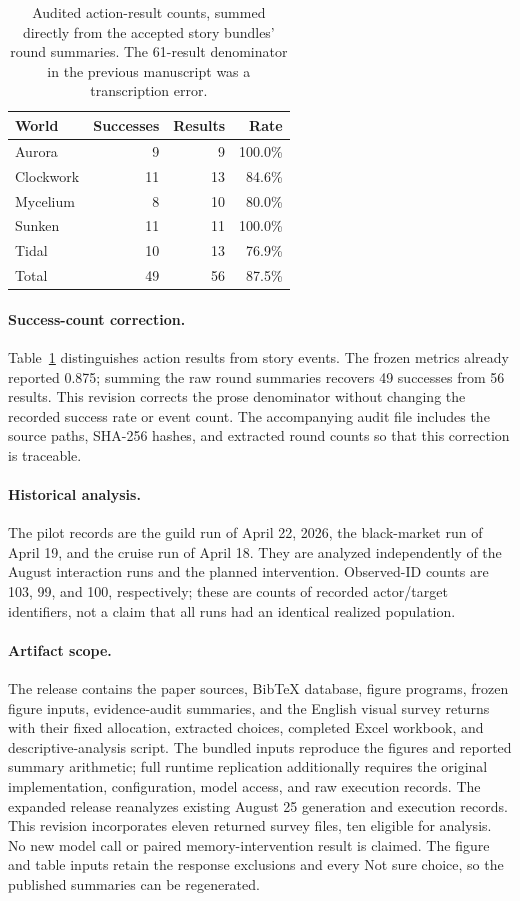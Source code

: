 \begin{table}[t]
\centering\small
\begin{tabular}{@{}lrrr@{}}
\toprule
World & Successes & Results & Rate \\
\midrule
Aurora & 9 & 9 & 100.0\% \\
Clockwork & 11 & 13 & 84.6\% \\
Mycelium & 8 & 10 & 80.0\% \\
Sunken & 11 & 11 & 100.0\% \\
Tidal & 10 & 13 & 76.9\% \\
\midrule
Total & 49 & 56 & 87.5\% \\
\bottomrule
\end{tabular}
\caption{Audited action-result counts, summed directly from the accepted
story bundles' round summaries. The 61-result denominator in the previous
manuscript was a transcription error.}
\label{tab:result-audit}
\end{table}

\paragraph{Success-count correction.}
Table~\ref{tab:result-audit} distinguishes action results from story events.
The frozen metrics already reported 0.875; summing the raw round summaries
recovers 49 successes from 56 results. This revision corrects the prose
denominator without changing the recorded success rate or event count.
The accompanying audit file includes the source paths, SHA-256 hashes, and
extracted round counts so that this correction is traceable.

\paragraph{Historical analysis.}
The pilot records are the guild run of April 22, 2026, the black-market run of
April 19, and the cruise run of April 18. They are analyzed independently of
the August interaction runs and the planned intervention. Observed-ID counts
are 103, 99, and 100, respectively; these are counts of recorded actor/target
identifiers, not a claim that all runs had an identical realized population.

\paragraph{Artifact scope.}
The release contains the paper sources, BibTeX database, figure programs,
frozen figure inputs, evidence-audit summaries, and the English visual survey
returns with their fixed allocation, extracted choices, completed Excel
workbook, and descriptive-analysis script. The bundled inputs reproduce the figures and reported
summary arithmetic; full runtime replication additionally requires the
original implementation, configuration, model access, and raw execution
records. The expanded release reanalyzes existing August 25 generation and execution
records. This revision incorporates eleven returned survey files, ten eligible
for analysis. No new model call or paired memory-intervention result is
claimed. The figure and table inputs retain the response exclusions and every
Not sure choice, so the published summaries can be regenerated.
